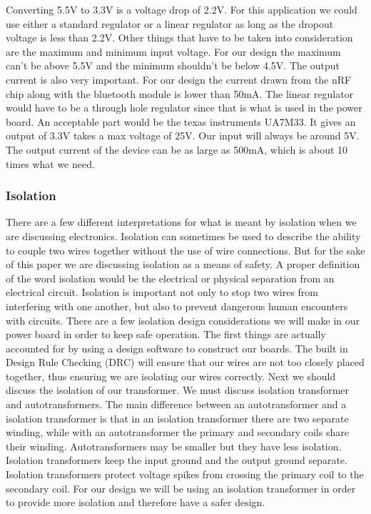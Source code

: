Converting 5.5V to 3.3V is a voltage drop of 2.2V. For this application we
could use either a standard regulator or a linear regulator as long as the
dropout voltage is less than 2.2V. Other things that have to be taken into
consideration are the maximum and minimum input voltage. For our design the
maximum can{}'t be above 5.5V and the minimum shouldn{}'t be below 4.5V. The
output current is also very important. For our design the current drawn from
the nRF chip along with the bluetooth module is lower than 50mA. The linear
regulator would have to be a through hole regulator since that is what is used
in the power board. An acceptable part would be the texas instruments UA7M33.
It gives an output of 3.3V takes a max voltage of 25V. Our input will always be
around 5V. The output current of the device can be as large as 500mA, which is
about 10 times what we need.

\subsubsection{Isolation}
There are a few different interpretations for what is meant by isolation when
we are discussing electronics. Isolation can sometimes be used to describe the
ability to couple two wires together without the use of wire connections. But
for the sake of this paper we are discussing isolation as a means of safety. A
proper definition of the word isolation would be the electrical or physical
separation from an electrical circuit. Isolation is important not only to stop
two wires from interfering with one another, but also to prevent dangerous
human encounters with circuits. There are a few isolation design considerations
we will make in our power board in order to keep safe operation. The first
things are actually accounted for by using a design software to construct our
boards. The built in Design Rule Checking (DRC) will ensure that our wires are
not too closely placed together, thus ensuring we are isolating our wires
correctly. Next we should discuss the isolation of our transformer. We must
discuss isolation transformer and  autotransformers. The main difference
between an autotransformer and a isolation transformer is that in an isolation
transformer there are two separate winding, while with an autotransformer the
primary and secondary coils share their winding. Autotransformers may be
smaller but they have less isolation. Isolation transformers keep the input
ground and the output ground separate. Isolation transformers protect voltage
spikes from crossing the primary coil to the secondary coil. For our design we
will be using an isolation transformer in order to provide more isolation and
therefore have a safer
design.\cite{link10}


